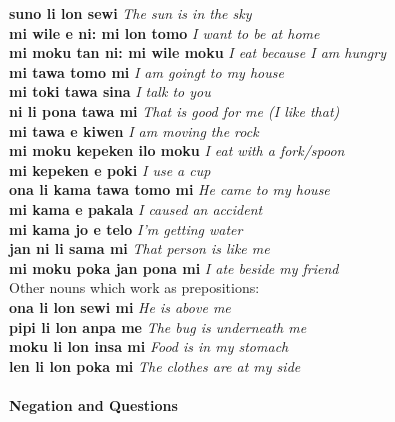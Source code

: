 \documentclass[10pt,a4paper]{article}
\begin{document}
\begin{multicols}{2}
\noindent\textbf{suno li lon sewi} \textit{The sun is in the sky}\\
\noindent\textbf{mi wile e ni: mi lon tomo} \textit{I want to be at home}\\

\noindent\textbf{mi moku tan ni: mi wile moku} \textit{I eat because I am hungry}\\

\noindent\textbf{mi tawa tomo mi} \textit{I am goingt to my house}\\
\noindent\textbf{mi toki tawa sina} \textit{I talk to you}\\
\noindent\textbf{ni li pona tawa mi} \textit{That is good for me (I like that)}\\
\noindent\textbf{mi tawa e kiwen} \textit{I am moving the rock}\\

\noindent\textbf{mi moku kepeken ilo moku} \textit{I eat with a fork/spoon}\\
\noindent\textbf{mi kepeken e poki} \textit{I use a cup}\\

\noindent\textbf{ona li kama tawa tomo mi} \textit{He came to my house}\\
\noindent\textbf{mi kama e pakala} \textit{I caused an accident}\\
\noindent\textbf{mi kama jo e telo} \textit{I'm getting water}\\

\noindent\textbf{jan ni li sama mi} \textit{That person is like me}\\

\noindent\textbf{mi moku poka jan pona mi} \textit{I ate beside my friend}\\

\noindent Other nouns which work as prepositions:\\
\noindent\textbf{ona li lon sewi mi} \textit{He is above me}\\
\noindent\textbf{pipi li lon anpa me} \textit{The bug is underneath me}\\
\noindent\textbf{moku li lon insa mi} \textit{Food is in my stomach}\\
\noindent\textbf{len li lon poka mi} \textit{The clothes are at my side}
\end{multicols}



\paragraph{Negation and Questions}
\end{document}
